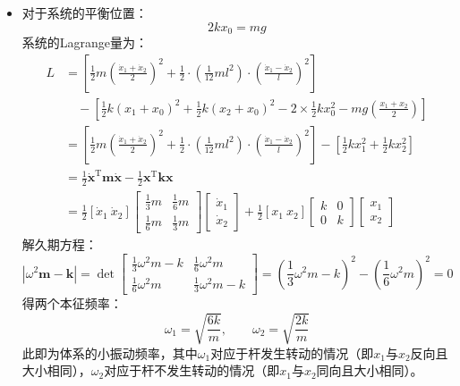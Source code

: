 \documentclass[a4paper,fontset=windows]{ctexart}
\begin{document}
\begin{itemize}
        \item[3.3.(1)]
        对于系统的平衡位置：
        \[
        2kx_0 = mg
        \]
        系统的Lagrange量为：
        \begin{align*}
            L
            &= \left[\frac{1}{2}m\left(\frac{\dot{x}_1+\dot{x}_2}{2}\right)^2 + \frac{1}{2}\cdot\left(\frac{1}{12}ml^2\right)\cdot\left(\frac{\dot{x}_1 - \dot{x}_2}{l}\right)^2\right] \\
            &\quad - \left[\frac{1}{2}k(x_1+x_0)^2 + \frac{1}{2}k(x_2+x_0)^2 - 2\times\frac{1}{2}kx_0^2 - mg\left(\frac{x_1+x_2}{2}\right)\right] \\
            &= \left[\frac{1}{2}m\left(\frac{\dot{x}_1+\dot{x}_2}{2}\right)^2 + \frac{1}{2}\cdot\left(\frac{1}{12}ml^2\right)\cdot\left(\frac{\dot{x}_1 - \dot{x}_2}{l}\right)^2\right] - \left[\frac{1}{2}kx_1^2 + \frac{1}{2}kx_2^2\right] \\
            &= \frac{1}{2}\boldsymbol{\dot{x}}^{\mathrm{T}}\boldsymbol{m}\boldsymbol{\dot{x}} - \frac{1}{2}\boldsymbol{x}^{\mathrm{T}}\boldsymbol{k}\boldsymbol{x} \\
            &= \frac{1}{2}
            [\dot{x}_1\ \dot{x}_2]
            \begin{bmatrix}
                \frac{1}{3}m & \frac{1}{6}m \\
                \frac{1}{6}m & \frac{1}{3}m
            \end{bmatrix}
            \begin{bmatrix}
                \dot{x}_1 \\
                \dot{x}_2
            \end{bmatrix}
            + \frac{1}{2}
            [x_1\ x_2]
            \begin{bmatrix}
                k & 0 \\
                0 & k
            \end{bmatrix}
            \begin{bmatrix}
                x_1 \\
                x_2
            \end{bmatrix}
        \end{align*}
        解久期方程：
        \[
        \left|\omega^2\boldsymbol{m}- \boldsymbol{k}\right|
        = \det
        \begin{bmatrix}
            \frac{1}{3}\omega^2m-k & \frac{1}{6}\omega^2m \\
            \frac{1}{6}\omega^2m & \frac{1}{3}\omega^2m-k
        \end{bmatrix}
        = \left(\frac{1}{3}\omega^2m-k\right)^2 - \left(\frac{1}{6}\omega^2m\right)^2
        = 0
        \]
        得两个本征频率：
        \[
        \omega_1 = \sqrt{\frac{6k}{m}},\qquad \omega_2 = \sqrt{\frac{2k}{m}}
        \]
        此即为体系的小振动频率，其中$\omega_1$对应于杆发生转动的情况（即$x_1$与$x_2$反向且大小相同），$\omega_2$对应于杆不发生转动的情况（即$x_1$与$x_2$同向且大小相同）。
        \bigskip


\end{itemize}
\end{document}
